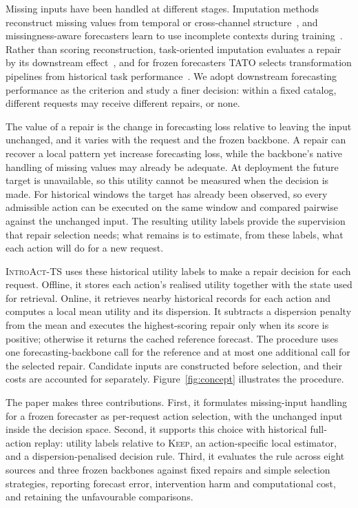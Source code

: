 \documentclass{article}
\newcommand{\introact}{\textsc{IntroAct-TS}}
\begin{document}
Missing inputs have been handled at different stages. Imputation methods reconstruct missing
values from temporal or cross-channel
structure~\citep{cao2018brits,tashiro2021csdi,du2023saits}, and missingness-aware forecasters
learn to use incomplete contexts during training~\citep{chen2024bitgraph,peng2025s4m}.
Rather than scoring reconstruction, task-oriented imputation evaluates a repair by its
downstream effect~\citep{wang2024taskoriented,hao2025toivsf,xu2026srdi}, and for frozen
forecasters TATO selects transformation pipelines from historical task
performance~\citep{qiu2026tato}. We adopt downstream forecasting performance as the criterion
and study a finer decision: within a fixed catalog, different requests may receive different
repairs, or none.

The value of a repair is the change in forecasting loss relative to leaving the input
unchanged, and it varies with the request and the frozen backbone. A repair can recover a
local pattern yet increase forecasting loss, while the backbone's native handling of missing
values may already be adequate. At deployment the future target is unavailable, so this
utility cannot be measured when the decision is made. For historical windows the target has
already been observed, so every admissible action can be executed on the same window and
compared pairwise against the unchanged input. The resulting utility labels provide the
supervision that repair selection needs; what remains is to estimate, from these labels, what
each action will do for a new request.

\introact{} uses these historical utility labels to make a repair decision for each request.
Offline, it stores each action's realised utility together with the state used for retrieval.
Online, it retrieves nearby historical records for each action and computes a local mean
utility and its dispersion. It subtracts a dispersion penalty from the mean and executes the
highest-scoring repair only when its score is positive; otherwise it returns the cached
reference forecast. The procedure uses one forecasting-backbone call for the reference and at
most one additional call for the selected repair. Candidate inputs are constructed before
selection, and their costs are accounted for separately. Figure~\ref{fig:concept} illustrates
the procedure.

The paper makes three contributions. First, it formulates missing-input handling for a frozen
forecaster as per-request action selection, with the unchanged input inside the decision
space. Second, it supports this choice with historical full-action replay: utility labels
relative to \textsc{Keep}, an action-specific local estimator, and a dispersion-penalised
decision rule. Third, it evaluates the rule across eight sources and three frozen backbones
against fixed repairs and simple selection strategies, reporting forecast error, intervention
harm and computational cost, and retaining the unfavourable comparisons.
\end{document}
